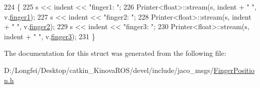 \begin{DoxyCode}
224   \{
225     s << indent << \textcolor{stringliteral}{"finger1: "};
226     Printer<float>::stream(s, indent + \textcolor{stringliteral}{"  "}, v.\hyperlink{structjaco__msgs_1_1FingerPosition___a5e08265efb8023ba04d99d556e186b14}{finger1});
227     s << indent << \textcolor{stringliteral}{"finger2: "};
228     Printer<float>::stream(s, indent + \textcolor{stringliteral}{"  "}, v.\hyperlink{structjaco__msgs_1_1FingerPosition___a7dcdd9f48dc0ff847c0170a096038917}{finger2});
229     s << indent << \textcolor{stringliteral}{"finger3: "};
230     Printer<float>::stream(s, indent + \textcolor{stringliteral}{"  "}, v.\hyperlink{structjaco__msgs_1_1FingerPosition___abb7ec1eff7489809a20c32b8ea19386b}{finger3});
231   \}
\end{DoxyCode}


The documentation for this struct was generated from the following file\+:\begin{DoxyCompactItemize}
\item 
D\+:/\+Longfei/\+Desktop/catkin\+\_\+\+Kinova\+R\+O\+S/devel/include/jaco\+\_\+msgs/\hyperlink{FingerPosition_8h}{Finger\+Position.\+h}\end{DoxyCompactItemize}

